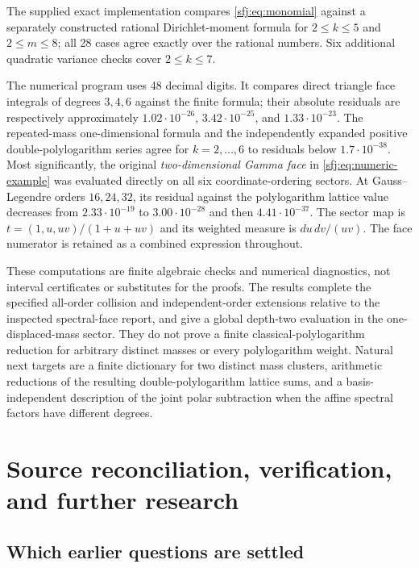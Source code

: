 \documentclass[11pt,letterpaper]{article}
\numberwithin{equation}{section}
\theoremstyle{definition}
\theoremstyle{remark}
\begin{document}
The supplied exact implementation compares
\eqref{sfj:eq:monomial} against a separately constructed rational
Dirichlet-moment formula for $2\le k\le5$ and $2\le m\le8$;
all 28 cases agree exactly over the rational numbers.  Six additional
quadratic variance checks cover $2\le k\le7$.

The numerical program uses 48 decimal digits.  It compares direct
triangle face integrals of degrees $3,4,6$ against the finite formula;
their absolute residuals are respectively approximately
$1.02\cdot10^{-26}$, $3.42\cdot10^{-25}$, and
$1.33\cdot10^{-23}$.  The repeated-mass one-dimensional formula and
the independently expanded positive double-polylogarithm series agree
for $k=2,\ldots,6$ to residuals below $1.7\cdot10^{-38}$.
Most significantly, the original \emph{two-dimensional Gamma face}
in \eqref{sfj:eq:numeric-example} was evaluated directly on all six
coordinate-ordering sectors.  At Gauss--Legendre orders $16,24,32$,
its residual against the polylogarithm lattice value decreases from
$2.33\cdot10^{-19}$ to $3.00\cdot10^{-28}$ and then
$4.41\cdot10^{-37}$.  The sector map is
$t=(1,u,uv)/(1+u+uv)$ and its weighted measure is $du\,dv/(uv)$.
The face numerator is retained as a combined expression throughout.

These computations are finite algebraic checks and numerical
diagnostics, not interval certificates or substitutes for the proofs.
The results complete the specified all-order collision and
independent-order extensions relative to the inspected spectral-face
report, and give a global depth-two evaluation in the one-displaced-mass
sector.  They do not prove a finite classical-polylogarithm reduction
for arbitrary distinct masses or every polylogarithm weight.  Natural
next targets are a finite dictionary for two distinct mass clusters,
arithmetic reductions of the resulting double-polylogarithm lattice
sums, and a basis-independent description of the joint polar
subtraction when the affine spectral factors have different degrees.



\section{Source reconciliation, verification, and further research}
\label{sec:audit}

\subsection{Which earlier questions are settled}
\end{document}
